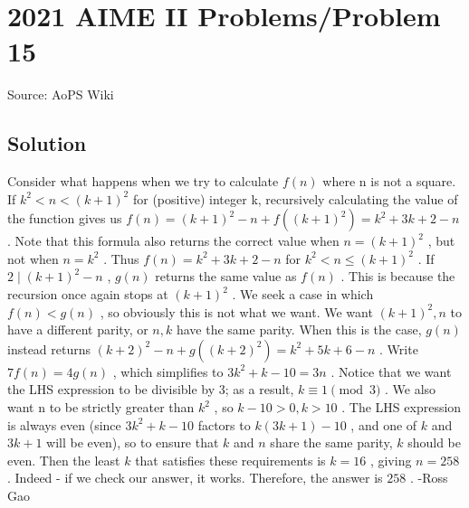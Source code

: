 \documentclass[12pt]{article}
\begin{document}
\section*{{2021 AIME II Problems/Problem 15}}
Source: AoPS Wiki

\subsection*{Solution}
Consider what happens when we try to calculate $f(n)$ where n is not a square. If $k^2<n<(k+1)^2$ for (positive) integer k, recursively calculating the value of the function gives us $f(n)=(k+1)^2-n+f((k+1)^2)=k^2+3k+2-n$ . Note that this formula also returns the correct value when $n=(k+1)^2$ , but not when $n=k^2$ . Thus $f(n)=k^2+3k+2-n$ for $k^2<n \leq (k+1)^2$ . If $2 \mid (k+1)^2-n$ , $g(n)$ returns the same value as $f(n)$ . This is because the recursion once again stops at $(k+1)^2$ . We seek a case in which $f(n)<g(n)$ , so obviously this is not what we want. We want $(k+1)^2,n$ to have a different parity, or $n, k$ have the same parity. When this is the case, $g(n)$ instead returns $(k+2)^2-n+g((k+2)^2)=k^2+5k+6-n$ . Write $7f(n)=4g(n)$ , which simplifies to $3k^2+k-10=3n$ . Notice that we want the LHS expression to be divisible by 3; as a result, $k \equiv 1 \pmod{3}$ . We also want n to be strictly greater than $k^2$ , so $k-10>0, k>10$ . The LHS expression is always even (since $3k^2+k-10$ factors to $k(3k+1)-10$ , and one of $k$ and $3k+1$ will be even), so to ensure that $k$ and $n$ share the same parity, $k$ should be even. Then the least $k$ that satisfies these requirements is $k=16$ , giving $n=258$ . Indeed - if we check our answer, it works. Therefore, the answer is $\boxed{258}$ . -Ross Gao
\end{document}
